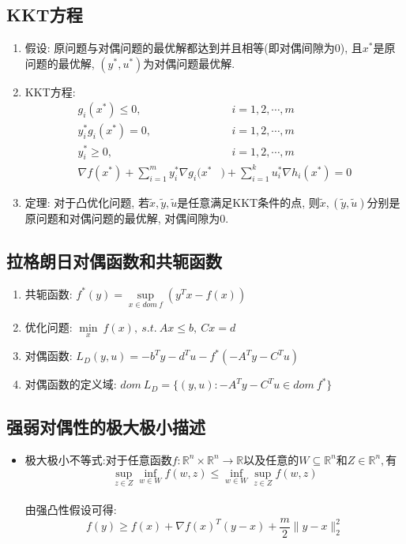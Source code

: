 \documentclass[UTF8]{article}
\begin{document}
\subsection{KKT方程}
\begin{enumerate}
	\item 假设: 原问题与对偶问题的最优解都达到并且相等(即对偶间隙为0), 且$x^*$是原问题的最优解, $(y^*, u^*)$为对偶问题最优解.
	\item KKT方程:
	\begin{displaymath}
	\begin{aligned}
		g_i(x^*)\leq 0,&\quad i=1,2,\cdots,m \\
		y_i^* g_i(x^*) = 0,&\quad i=1,2,\cdots,m \\
		y_i^* \geq 0,&\quad i=1,2,\cdots,m \\
		\nabla f(x^*)+\sum\limits_{i=1}^m y_i^* \nabla g_i(x^*&) + \sum\limits_{i=1}^k u_i^* \nabla h_i(x^*)=0
	\end{aligned}
	\end{displaymath}
	\item 定理: 对于凸优化问题, 若$\tilde{x},\tilde{y},\tilde{u}$是任意满足KKT条件的点, 则$\tilde{x},(\tilde{y},\tilde{u})$分别是原问题和对偶问题的最优解, 对偶间隙为$0$.
\end{enumerate}
		
\subsection{拉格朗日对偶函数和共轭函数}
\begin{enumerate}
	\item 共轭函数: $f^*(y)=\sup\limits_{x\in dom\ f}(y^T x-f(x))$
	\item 优化问题: $\min\limits_x\ f(x),\ s.t.\ Ax\leq b,\ Cx=d$
	\item 对偶函数: $L_D(y,u)=-b^T y-d^T u-f^* (-A^T y-C^T u)$
	\item 对偶函数的定义域: $dom\ L_D=\{(y,u):-A^T y-C^T u\in dom\ f^*\}$
\end{enumerate}
\subsection{强弱对偶性的极大极小描述}
\begin{itemize}
\item 极大极小不等式:对于任意函数$f:\mathbb{R}^n\times \mathbb{R}^n \rightarrow \mathbb{R}以及任意的W\subseteq \mathbb{R}^n 和Z \in \mathbb{R}^n,有$
\[\sup\limits_{z\in Z}\inf\limits_{w \in W}f(w,z) \leq \inf\limits_{w \in W}\sup\limits_{z\in Z}f(w,z)\]\\
由强凸性假设可得:\\
\[f(y) \geq f(x)+ \nabla f(x)^T(y-x) + \frac{m}{2}\lVert y-x \rVert_2^2 \]
\end{itemize}
\end{document}
